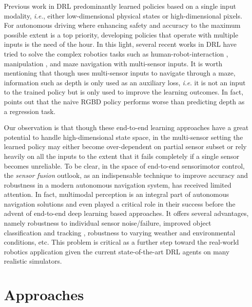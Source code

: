 \documentclass[../thesis.tex]{subfiles}
\begin{document}
 
Previous work in DRL predominantly learned policies based on a single input modality, \textit{i.e.}, either low-dimensional physical states or high-dimensional pixels. 
For autonomous driving where enhancing safety and accuracy to the maximum possible extent is a top priority, developing policies that operate with multiple inputs is the need of the hour. 
In this light, several recent works in DRL have tried to solve the complex robotics tasks such as human-robot-interaction \cite{qureshi2016robot}, manipulation \cite{levine2016end}, and maze navigation \cite{mirowski2017a} with multi-sensor inputs. 
It is worth mentioning that though \citet{mirowski2017a} uses multi-sensor inputs to navigate through a maze, information such as depth is only used as an auxiliary loss, \textit{i.e.} it is not an input to the trained policy but is only used to improve the learning outcomes. 
In fact, \citet{mirowski2017a} points out that the naive RGBD policy performs worse than predicting depth as a regression task.

Our observation is that though these end-to-end learning approaches have a great potential to handle high-dimensional state space, in the multi-sensor setting the learned policy may either become over-dependent on partial sensor subset or rely heavily on all the inputs to the extent that it fails completely if a single sensor becomes unreliable.
To be clear, in the space of end-to-end sensorimotor control, the \textit{sensor fusion} outlook, as an indispensable technique to improve accuracy and robustness in a modern autonomous navigation system, has received limited attention. 
In fact, multimodal perception is an integral part of autonomous navigation solutions and even played a critical role in their success \cite{multimodaltartan} before the advent of end-to-end deep learning based approaches. 
It offers several advantages, namely robustness to individual sensor noise/failure, improved object classification and tracking \cite{elfring2016multisensor, cho2014multi, darms2008classification}, robustness to varying weather and environmental conditions, etc. 
This problem is critical as a further step toward the real-world robotics application given the current state-of-the-art DRL agents on many realistic simulators.

 

 
 
\section{Approaches}
 
\end{document}
